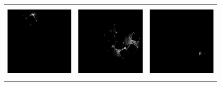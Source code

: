 \begin{figure}[t]
    \begin{center}
        \begin{tabular}{c c c}
            \includegraphics[width=1.5in, height=1.5in]{Counting/LaTeX/figures/putasideall/limitscaleresamplingoptionnetworkputaside/image1/touse/8.png}          & \includegraphics[width=1.5in, height=1.5in]{Counting/LaTeX/figures/putasideall/limitscaleresamplingoptionnetworkputaside/image1/touse/2.png}          & \includegraphics[width=1.5in, height=1.5in]{Counting/LaTeX/figures/putasideall/limitscaleresamplingoptionnetworkputaside/image1/touse/17.png}          \\

\end{tabular}
\end{center}
\end{figure}
